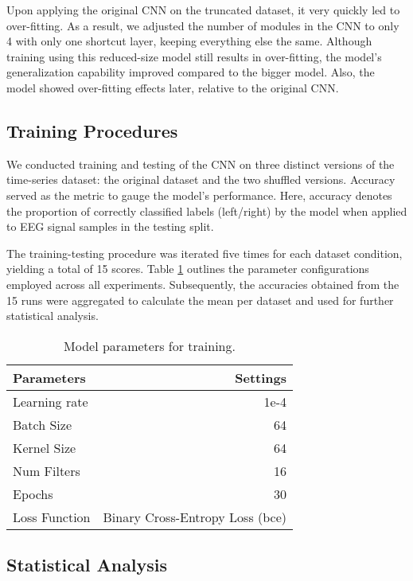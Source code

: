 \documentclass[11pt]{article}
\begin{document}
Upon applying the original CNN on the truncated dataset, it very quickly led to over-fitting. As a result, we adjusted the number of modules in the CNN to only 4 with only one shortcut layer, keeping everything else the same. Although training using this reduced-size model still results in over-fitting, the model's generalization capability improved compared to the bigger model. Also, the model showed over-fitting effects later, relative to the original CNN.

\subsection{Training Procedures}

We conducted training and testing of the CNN on three distinct versions of the time-series dataset: the original dataset and the two shuffled versions. Accuracy served as the metric to gauge the model's performance. Here, accuracy denotes the proportion of correctly classified labels (left/right) by the model when applied to EEG signal samples in the testing split.

The training-testing procedure was iterated five times for each dataset condition, yielding a total of 15 scores. Table \ref{parameters} outlines the parameter configurations employed across all experiments. Subsequently, the accuracies obtained from the 15 runs were aggregated to calculate the mean per dataset and used for further statistical analysis.

\begin{table}[H]
\begin{center}
\begin{tabular}{|l|r|} \hline
{\bf Parameters} & {\bf Settings} \\ \hline
Learning rate & 1e-4 \\
Batch Size & 64 \\
Kernel Size & 64 \\
Num Filters & 16 \\
Epochs & 30 \\ 
Loss Function & Binary Cross-Entropy Loss (bce) \\ \hline
\end{tabular}
\caption{Model parameters for training.}
\label{parameters}
\end{center}
\end{table}

\subsection{Statistical Analysis}
\end{document}
